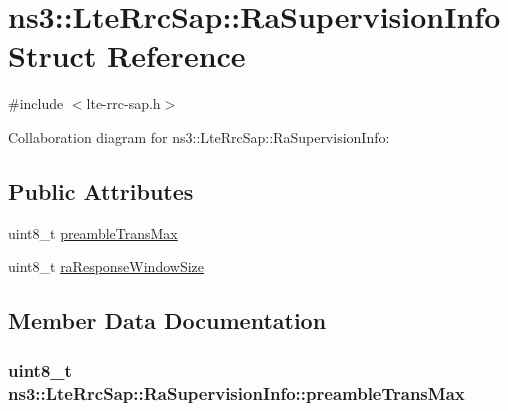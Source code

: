 \hypertarget{structns3_1_1LteRrcSap_1_1RaSupervisionInfo}{}\section{ns3\+:\+:Lte\+Rrc\+Sap\+:\+:Ra\+Supervision\+Info Struct Reference}
\label{structns3_1_1LteRrcSap_1_1RaSupervisionInfo}


{\ttfamily \#include $<$lte-\/rrc-\/sap.\+h$>$}



Collaboration diagram for ns3\+:\+:Lte\+Rrc\+Sap\+:\+:Ra\+Supervision\+Info\+:
\subsection*{Public Attributes}
\begin{DoxyCompactItemize}
\item 
uint8\+\_\+t \hyperlink{structns3_1_1LteRrcSap_1_1RaSupervisionInfo_af7b43f2ed842c3fb42a086776641c376}{preamble\+Trans\+Max}
\item 
uint8\+\_\+t \hyperlink{structns3_1_1LteRrcSap_1_1RaSupervisionInfo_ae1c706fe6418419f8693121b6a5a87b8}{ra\+Response\+Window\+Size}
\end{DoxyCompactItemize}


\subsection{Member Data Documentation}
\subsubsection[{\texorpdfstring{preamble\+Trans\+Max}{preambleTransMax}}]{\setlength{\rightskip}{0pt plus 5cm}uint8\+\_\+t ns3\+::\+Lte\+Rrc\+Sap\+::\+Ra\+Supervision\+Info\+::preamble\+Trans\+Max}\hypertarget{structns3_1_1LteRrcSap_1_1RaSupervisionInfo_af7b43f2ed842c3fb42a086776641c376}{}\label{structns3_1_1LteRrcSap_1_1RaSupervisionInfo_af7b43f2ed842c3fb42a086776641c376}
